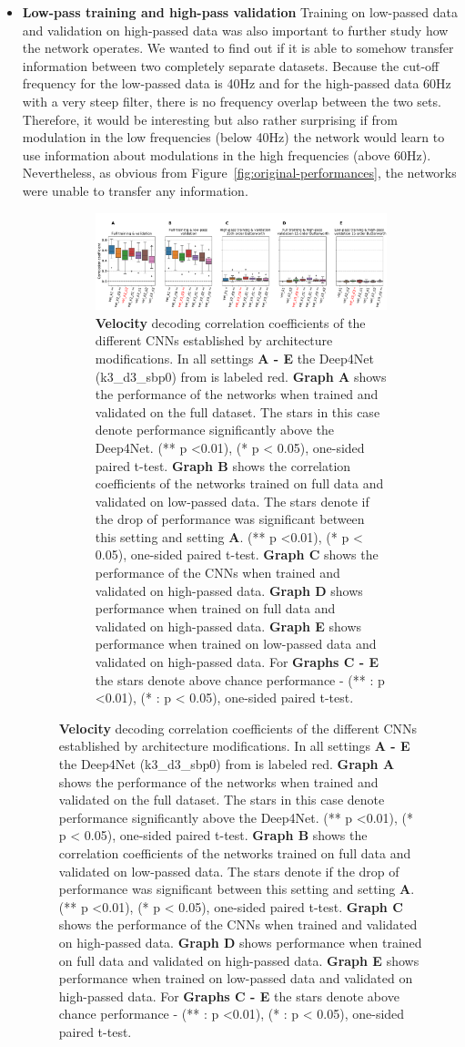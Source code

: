 \begin{itemize}
    \item \textbf{Low-pass training and high-pass validation}
    Training on low-passed data and validation on high-passed data was also important to further study how the network operates.
    We wanted to find out if it is able to somehow transfer information between two completely separate datasets.
    Because the cut-off frequency for the low-passed data is 40Hz and for the high-passed data 60Hz with a very steep filter, there is no frequency overlap between the two sets.
    Therefore, it would be interesting but also rather surprising if from modulation in the low frequencies (below 40Hz) the network would learn to use information about modulations in the high frequencies (above 60Hz).
    Nevertheless, as obvious from Figure~\ref{fig:original-performances}, the networks were unable to transfer any information.
    
\begin{figure}[!htpb]
\centering
\begin{subfigure}[b]{\textwidth}
   \includegraphics[width=1\linewidth]{img/ch4/original_setting_vel_performance_comparison}
   \caption{\textbf{Velocity} decoding correlation coefficients of the different CNNs established by architecture modifications. In all settings \textbf{
   A - E} the Deep4Net (k3\_d3\_sbp0) from \cite{Hammer-2021} is labeled red. \textbf{Graph A} shows the performance of the networks when trained and validated on the full dataset. The stars in this case denote performance significantly above the Deep4Net. (** p <0.01), (* p < 0.05), one-sided paired t-test.
   \textbf{Graph B} shows the correlation coefficients of the networks trained on full data and validated on low-passed data. 
   The stars denote if the drop of performance was significant between this setting and setting \textbf{A}. (** p <0.01), (* p < 0.05), one-sided paired t-test.
   \textbf{Graph C} shows the performance of the CNNs when trained and validated on high-passed data. \textbf{Graph D} shows performance when trained on full data and validated on high-passed data. \textbf{Graph E} shows performance when trained on low-passed data and validated on high-passed data. For \textbf{Graphs C - E} the stars denote above chance performance - (** : p <0.01), (* : p < 0.05), one-sided paired t-test.}
   \label{fig:original-performances-velocity} 
\end{subfigure}


\end{figure}
\end{itemize}

